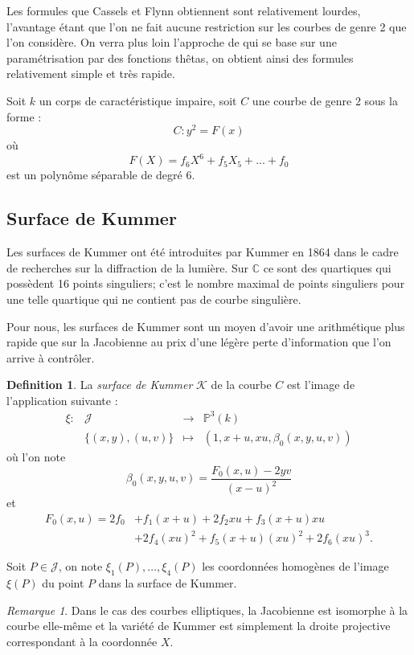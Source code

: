 \documentclass[a4paper]{article}
\theoremstyle{definition}
\newtheorem{definition}{Definition}[section]
\theoremstyle{remark}
\newtheorem{remarque}{Remarque}
\numberwithin{equation}{section}
\begin{document}
Les formules que Cassels et Flynn obtiennent sont relativement lourdes, l'avantage étant que l'on ne fait aucune restriction sur les courbes de genre 2 que l'on considère. On verra plus loin l'approche de \citet{gaudry} qui se base sur une paramétrisation par des fonctions thêtas, on obtient ainsi des formules relativement simple et très rapide.

Soit $k$ un corps de caractéristique impaire, soit $C$ une courbe de genre 2 sous la forme :
$$C : y^2 = F(x)$$
où $$F(X) = f_6X^6 + f_5X_5 + ... + f_0$$ est un polynôme séparable de degré 6.

\subsection{Surface de Kummer}
Les surfaces de Kummer ont été introduites par Kummer en 1864 dans le cadre de recherches sur la diffraction de la lumière. Sur $\mathbb{C}$ ce sont des quartiques qui possèdent 16 points singuliers; c'est le nombre maximal de points singuliers pour une telle quartique qui ne contient pas de courbe singulière.

Pour nous, les surfaces de Kummer sont un moyen d'avoir une arithmétique plus rapide que sur la Jacobienne au prix d'une légère perte d'information que l'on arrive à contrôler.

\begin{definition}
La \emph{surface de Kummer} $\mathcal{K}$ de la courbe $C$ est l'image de l'application suivante :
\begin{equation*}
\begin{array}{lrcl}
\xi : &\mathcal{J} & \longrightarrow & \mathbb{P}^3(k) \\
& \{(x,y),(u,v)\} & \longmapsto & (1,x+u,xu,\beta_0(x,y,u,v))
\end{array}
\end{equation*}
où l'on note
$$\beta_0(x,y,u,v) = \frac{F_0(x,u)-2yv}{(x-u)^2}$$
et
\begin{align*}
F_0(x,u)=2f_0&+f_1(x+u)+2f_2xu+f_3(x+u)xu \\
&+2f_4(xu)^2+f_5(x+u)(xu)^2+2f_6(xu)^3.
\end{align*}
\end{definition}

Soit $P \in \mathcal{J}$, on note $\xi_1(P),...,\xi_4(P)$ les coordonnées homogènes de l'image $\xi(P)$ du point $P$ dans la surface de Kummer.

\begin{remarque}
Dans le cas des courbes elliptiques, la Jacobienne est isomorphe à la courbe elle-même et la variété de Kummer est simplement la droite projective correspondant à la coordonnée $X$.
\end{remarque}
\end{document}
